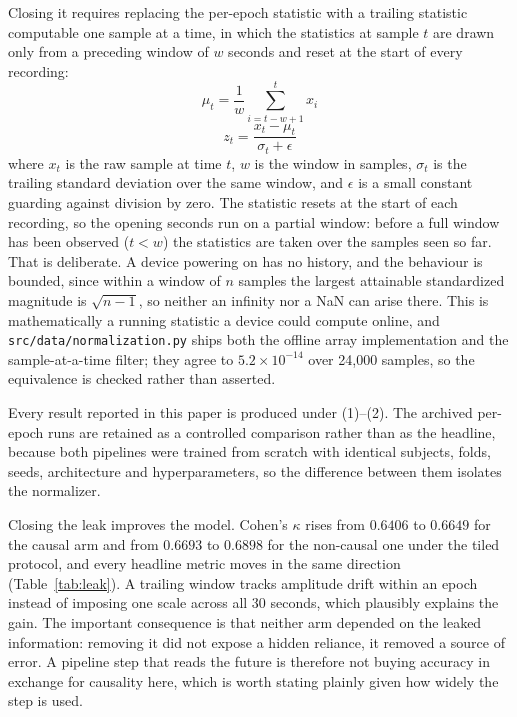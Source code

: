 \documentclass[conference]{IEEEtran}
\begin{document}
Closing it requires replacing the per-epoch statistic with a trailing statistic computable one
sample at a time, in which the statistics at sample $t$ are drawn only from a preceding window
of $w$ seconds and reset at the start of every recording:
\begin{equation}
\mu_t = \frac{1}{w}\sum_{i=t-w+1}^{t} x_i
\end{equation}
\begin{equation}
z_t = \frac{x_t - \mu_t}{\sigma_t + \epsilon}
\end{equation}
where $x_t$ is the raw sample at time $t$, $w$ is the window in samples, $\sigma_t$ is the
trailing standard deviation over the same window, and $\epsilon$ is a small constant guarding
against division by zero. The statistic resets at the start of each recording, so the opening
seconds run on a partial window: before a full window has been observed ($t < w$) the statistics
are taken over the samples seen so far. That is deliberate. A device powering on has no history,
and the behaviour is bounded, since within a window of $n$ samples the largest attainable
standardized magnitude is $\sqrt{n-1}$, so neither an infinity nor a NaN can arise there. This is
mathematically a running statistic a device could compute online, and
\texttt{src/data/normalization.py} ships both the offline array implementation and the
sample-at-a-time filter; they agree to $5.2\times10^{-14}$ over 24{,}000 samples, so the
equivalence is checked rather than asserted.

Every result reported in this paper is produced under (1)--(2). The archived per-epoch runs are
retained as a controlled comparison rather than as the headline, because both pipelines were
trained from scratch with identical subjects, folds, seeds, architecture and hyperparameters, so
the difference between them isolates the normalizer.

Closing the leak improves the model. Cohen's $\kappa$ rises from $0.6406$ to $0.6649$ for the
causal arm and from $0.6693$ to $0.6898$ for the non-causal one under the tiled protocol, and
every headline metric moves in the same direction (Table~\ref{tab:leak}). A trailing window
tracks amplitude drift within an epoch instead of imposing one scale across all 30 seconds,
which plausibly explains the gain. The important consequence is that neither arm depended on the
leaked information: removing it did not expose a hidden reliance, it removed a source of error.
A pipeline step that reads the future is therefore not buying accuracy in exchange for causality
here, which is worth stating plainly given how widely the step is used.
\end{document}

